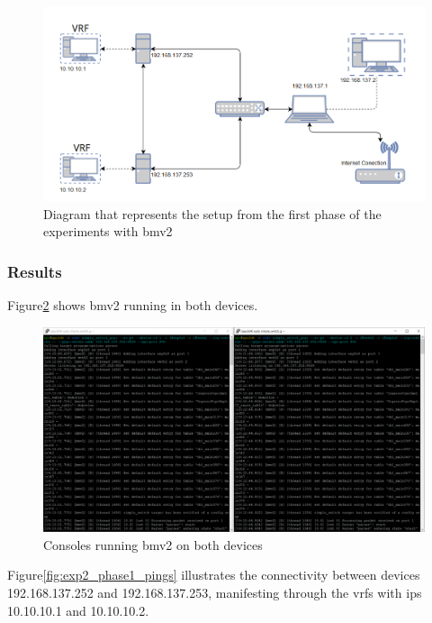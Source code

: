 \begin{figure}
	\centering
	\includegraphics[width=\textwidth]{Chapters/Figures/tests/bmv2_phase_1/setup_diagram.PNG}
	\caption{Diagram that represents the setup from the first phase of the experiments with \gls{bmv2}}
	\label{fig:exp2_phase1_diagram}
\end{figure}

\subsubsection{Results}

Figure\ref{fig:exp2_phase1_bmv2} shows \gls{bmv2} running in both devices.

\begin{figure}
	\centering
	\includegraphics[width=\textwidth]{Chapters/Figures/tests/bmv2_phase_1/bmv2_running.PNG}
	\caption{Consoles running \gls{bmv2} on both devices}
	\label{fig:exp2_phase1_bmv2}
\end{figure}

Figure\ref{fig:exp2_phase1_pings} illustrates the connectivity between devices 192.168.137.252 and 192.168.137.253, manifesting through the \glspl{vrf} with \glspl{ip} 10.10.10.1 and 10.10.10.2.

